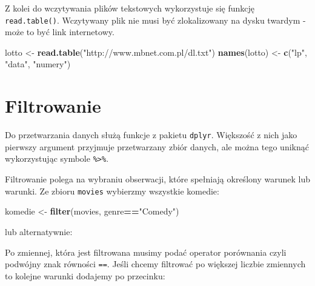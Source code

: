\documentclass[]{book}
\newenvironment{Shaded}{\begin{snugshade}}{\end{snugshade}}
\newcommand{\KeywordTok}[1]{\textcolor[rgb]{0.13,0.29,0.53}{\textbf{#1}}}
\newcommand{\StringTok}[1]{\textcolor[rgb]{0.31,0.60,0.02}{#1}}
\newcommand{\OperatorTok}[1]{\textcolor[rgb]{0.81,0.36,0.00}{\textbf{#1}}}
\newcommand{\NormalTok}[1]{#1}
\begin{document}
Z kolei do wczytywania plików tekstowych wykorzystuje się funkcję
\texttt{read.table()}. Wczytywany plik nie musi być zlokalizowany na
dysku twardym - może to być link internetowy.

\begin{Shaded}
\begin{Highlighting}[]
\NormalTok{lotto <-}\StringTok{ }\KeywordTok{read.table}\NormalTok{(}\StringTok{"http://www.mbnet.com.pl/dl.txt"}\NormalTok{)}
\KeywordTok{names}\NormalTok{(lotto) <-}\StringTok{ }\KeywordTok{c}\NormalTok{(}\StringTok{"lp"}\NormalTok{, }\StringTok{"data"}\NormalTok{, }\StringTok{"numery"}\NormalTok{)}
\end{Highlighting}
\end{Shaded}

\section{Filtrowanie}\label{filtrowanie}

Do przetwarzania danych służą funkcje z pakietu \texttt{dplyr}.
Większość z nich jako pierwszy argument przyjmuje przetwarzany zbiór
danych, ale można tego uniknąć wykorzystując symbole
\texttt{\%\textgreater{}\%}.

Filtrowanie polega na wybraniu obserwacji, które spełniają określony
warunek lub warunki. Ze zbioru \texttt{movies} wybierzmy wszystkie
komedie:

\begin{Shaded}
\begin{Highlighting}[]
\NormalTok{komedie <-}\StringTok{ }\KeywordTok{filter}\NormalTok{(movies, genre}\OperatorTok{==}\StringTok{"Comedy"}\NormalTok{)}
\end{Highlighting}
\end{Shaded}

lub alternatywnie:

\begin{Shaded}
\end{Shaded}

Po zmiennej, która jest filtrowana musimy podać operator porównania
czyli podwójny znak równości \texttt{==}. Jeśli chcemy filtrować po
większej liczbie zmiennych to kolejne warunki dodajemy po przecinku:
\end{document}
